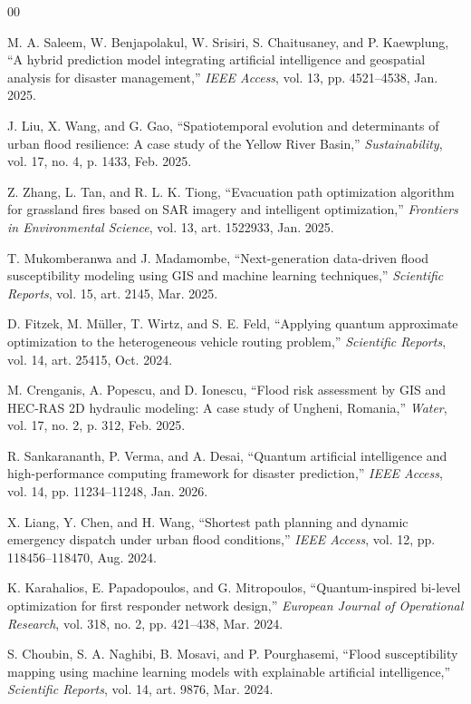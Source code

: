 \documentclass[conference]{IEEEtran}
\begin{document}
\begin{thebibliography}{00}

 M. A. Saleem, W. Benjapolakul, W. Srisiri, S. Chaitusaney, and P. Kaewplung, ``A hybrid prediction model integrating artificial intelligence and geospatial analysis for disaster management,'' \emph{IEEE Access}, vol. 13, pp. 4521--4538, Jan. 2025.

 J. Liu, X. Wang, and G. Gao, ``Spatiotemporal evolution and determinants of urban flood resilience: A case study of the Yellow River Basin,'' \emph{Sustainability}, vol. 17, no. 4, p. 1433, Feb. 2025.

 Z. Zhang, L. Tan, and R. L. K. Tiong, ``Evacuation path optimization algorithm for grassland fires based on SAR imagery and intelligent optimization,'' \emph{Frontiers in Environmental Science}, vol. 13, art. 1522933, Jan. 2025.

 T. Mukomberanwa and J. Madamombe, ``Next-generation data-driven flood susceptibility modeling using GIS and machine learning techniques,'' \emph{Scientific Reports}, vol. 15, art. 2145, Mar. 2025.

 D. Fitzek, M. M\"uller, T. Wirtz, and S. E. Feld, ``Applying quantum approximate optimization to the heterogeneous vehicle routing problem,'' \emph{Scientific Reports}, vol. 14, art. 25415, Oct. 2024.

 M. Crenganis, A. Popescu, and D. Ionescu, ``Flood risk assessment by GIS and HEC-RAS 2D hydraulic modeling: A case study of Ungheni, Romania,'' \emph{Water}, vol. 17, no. 2, p. 312, Feb. 2025.

 R. Sankarananth, P. Verma, and A. Desai, ``Quantum artificial intelligence and high-performance computing framework for disaster prediction,'' \emph{IEEE Access}, vol. 14, pp. 11234--11248, Jan. 2026.

 X. Liang, Y. Chen, and H. Wang, ``Shortest path planning and dynamic emergency dispatch under urban flood conditions,'' \emph{IEEE Access}, vol. 12, pp. 118456--118470, Aug. 2024.

 K. Karahalios, E. Papadopoulos, and G. Mitropoulos, ``Quantum-inspired bi-level optimization for first responder network design,'' \emph{European Journal of Operational Research}, vol. 318, no. 2, pp. 421--438, Mar. 2024.

 S. Choubin, S. A. Naghibi, B. Mosavi, and P. Pourghasemi, ``Flood susceptibility mapping using machine learning models with explainable artificial intelligence,'' \emph{Scientific Reports}, vol. 14, art. 9876, Mar. 2024.


\end{thebibliography}
\end{document}

